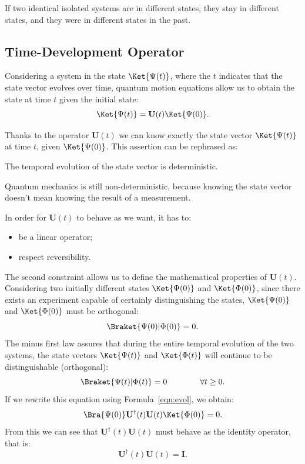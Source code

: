 \begin{axiom}
	If two identical isolated systems are in different states, they stay in different states, and they were in different states in the past.
\end{axiom}

\subsection{Time-Development Operator}
\label{sec:unitary_operator}
Considering a system in the state $\Ket{\Psi(t)}$, where the $t$ indicates that the state vector evolves over time, quantum motion equations allow us to obtain the state at time $t$ given the initial state:
\begin{equation}
	\label{eqn:evol}
	\Ket{\Psi(t)} = \mathbf{U}(t)\Ket{\Psi(0)}.
\end{equation}

Thanks to the operator $\mathbf{U}(t)$ we can know exactly the state vector $\Ket{\Psi(t)}$ at time $t$, given $\Ket{\Psi(0)}$. This assertion can be rephrased as:

\begin{axiom}
	The temporal evolution of the state vector is deterministic.
\end{axiom}

Quantum mechanics is still non-deterministic, because knowing the state vector doesn't mean knowing the result of a measurement.

In order for $\mathbf{U}(t)$ to behave as we want, it has to:
\begin{itemize}
	\item be a linear operator;
	\item respect reversibility.
\end{itemize}

The second constraint allows us to define the mathematical properties of $\mathbf{U}(t)$. Considering two initially different states $\Ket{\Psi(0)}$ and $\Ket{\Phi(0)}$, since there exists an experiment capable of certainly distinguishing the states, $\Ket{\Psi(0)}$ and $\Ket{\Phi(0)}$ must be orthogonal:
\[
\Braket{\Psi(0)|\Phi(0)} = 0.
\]
The minus first law assures that during the entire temporal evolution of the two systems, the state vectors $\Ket{\Psi(t)}$ and $\Ket{\Phi(t)}$ will continue to be distinguishable (orthogonal):
\[
\Braket{\Psi(t)|\Phi(t)} = 0 \qquad\qquad\forall t \geq 0.
\]
If we rewrite this equation using Formula~\ref{eqn:evol}, we obtain:
\[
\Bra{\Psi(0)}\mathbf{U}^\dagger(t) \mathbf{U}(t)\Ket{\Phi(0)} = 0.
\]
From this we can see that $\mathbf{U}^\dagger(t) \mathbf{U}(t)$ must behave as the identity operator, that is:
\begin{equation}
	\label{eqn:unit}
	\mathbf{U}^\dagger(t) \mathbf{U}(t) = \mathbf{I}.
\end{equation}

